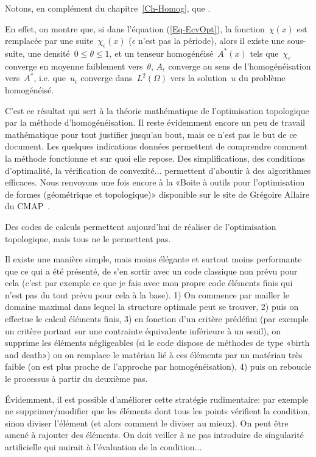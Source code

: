 \medskip
Notons, en complément du chapitre~\ref{Ch-Homog}, que .

En effet, on montre que, si dans l'équation (\ref{Eq-EcvOpt}), la fonction~$\chi(x)$ est remplacée par une suite~$\chi_\epsilon(x)$ ($\epsilon$ n'est pas la période), alors il existe une sous-suite, une densité~$0\le\theta\le1$, et un tenseur homogénéisé~$A^*(x)$ tels que~$\chi_\epsilon$ converge en moyenne faiblement vers~$\theta$, $A_\epsilon$ converge au sens de l'homogénéisation vers~$A^*$, i.e. que~$u_\epsilon$ converge dans~$L^2(\Omega)$ vers la solution~$u$ du problème homogénéisé.

\medskip
C'est ce résultat qui sert à la théorie mathématique de l'optimisation topologique par la méthode d'homogénéisation.
Il reste évidemment encore un peu de travail mathématique pour tout justifier jusqu'au bout, mais ce n'est pas le but de ce document. Les quelques indications données permettent de comprendre comment la méthode fonctionne et sur quoi elle repose.
Des simplifications, des conditions d'optimalité, la vérification de convexité... permettent d'aboutir à des algorithmes efficaces. Nous renvoyons une fois encore à la «Boite à outils \freefem pour l'optimisation de formes (géométrique et topologique)» disponible sur le site de Grégoire Allaire du CMAP~\cite{bib-AllaireOptimFF}.

\begin{remarque}
Des codes de calculs permettent aujourd'hui de réaliser de l'optimisation topologique, mais tous ne le permettent pas.

Il existe une manière simple, mais moins élégante et surtout moins performante que ce qui a été présenté, de s'en sortir avec un code classique non prévu pour cela (c'est par exemple ce que je fais avec mon propre code éléments finis qui n'est pas du tout prévu 
pour cela à la base).
1) On commence par mailler le domaine maximal dans lequel la structure optimale peut se trouver, 2) puis on effectue le calcul éléments finis, 3) en fonction d'un critère prédéfini (par exemple un critère portant sur une contrainte équivalente inférieure à un seuil), on supprime les éléments négligeables (si le code dispose de méthodes de type «birth and death») ou on remplace le matériau lié à ces éléments par un matériau très faible (on est plus proche de l'approche par homogénéisation), 4) puis on reboucle le processus à partir du deuxième pas. 

Évidemment, il est possible d'améliorer cette stratégie rudimentaire: par exemple ne supprimer/modifier que les éléments dont tous les points vérifient la condition, sinon diviser l'élément (et alors comment le diviser au mieux). On peut être amené à rajouter des éléments. On doit veiller à ne pas introduire de singularité artificielle qui nuirait à l'évaluation de la condition...
\end{remarque}

